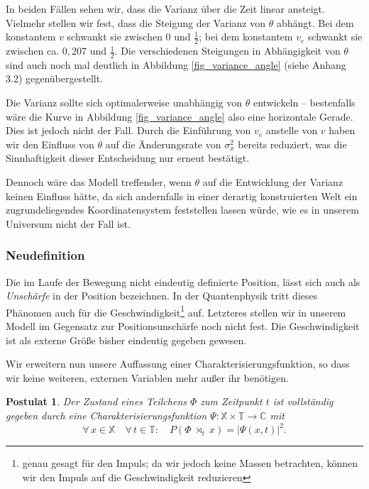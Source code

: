 \documentclass[a4paper,12pt,ngerman]{scrartcl}
\theoremstyle{plain}
\theoremstyle{plain}
\theoremstyle{plain}
\newtheorem{postulate}{Postulat}
\theoremstyle{plain}
\newcommand{\C}{\mathbb{C}}
\newcommand{\T}{\mathbb{T}}
\newcommand{\X}{\mathbb{X}}
\newcommand{\at}[1]{\;\rtimes_{#1}\;}
\begin{document}
In beiden Fällen sehen wir, dass die Varianz über die Zeit linear ansteigt. Vielmehr stellen wir fest, dass die Steigung der Varianz von $\theta$ abhängt. Bei dem konstantem $v$ schwankt sie zwischen 0 und $\frac{1}{2}$; bei dem konstantem $v_e$ schwankt sie zwischen ca. $0,207$ und $\frac{1}{2}$. Die verschiedenen Steigungen in Abhängigkeit von $\theta$ sind auch noch mal deutlich in Abbildung \ref{fig_variance_angle}  (siehe Anhang 3.2) gegenübergestellt.

Die Varianz sollte sich optimalerweise unabhängig von $\theta$ entwickeln -- bestenfalls wäre die Kurve in Abbildung \ref{fig_variance_angle} also eine horizontale Gerade. Dies ist jedoch nicht der Fall. Durch die Einführung von $v_e$ anstelle von $v$ haben wir den Einfluss von $\theta$ auf die Änderungsrate von $\sigma_x^2$ bereits reduziert, was die Sinnhaftigkeit dieser Entscheidung nur erneut bestätigt. 

Dennoch wäre das Modell treffender, wenn $\theta$ auf die Entwicklung der Varianz keinen Einfluss hätte, da sich andernfalls in einer derartig konstruierten Welt ein zugrundeliegendes Koordinatensystem feststellen lassen würde, wie es in unserem Universum nicht der Fall ist.

\subsubsection{Neudefinition}

Die im Laufe der Bewegung nicht eindeutig definierte Position, lässt sich auch als \textit{Unschärfe} in der Position bezeichnen. In der Quantenphysik tritt dieses Phänomen auch für die Geschwindigkeit\footnote{genau gesagt für den Impuls; da wir jedoch keine Massen betrachten, können wir den Impuls auf die Geschwindigkeit reduzieren} auf. Letzteres stellen wir in unserem Modell im Gegensatz zur Positionsunschärfe noch nicht fest. Die Geschwindigkeit ist als externe Größe bisher eindeutig gegeben gewesen.

Wir erweitern nun unsere Auffassung einer Charakterisierungsfunktion, so dass wir keine weiteren, externen Variablen mehr außer ihr benötigen.

{
\begin{postulate}
Der Zustand eines Teilchens $\Phi$ zum Zeitpunkt $t$ ist vollständig gegeben durch eine Charakterisierungsfunktion $\Psi: \X\times\T\rightarrow\C$ mit
\[\forall\, x\in\X\quad\forall\, t\in\T:\quad
P(\Phi\at{t}x)=|\Psi(x,t)|^2.\]
\end{postulate}
}
\end{document}
